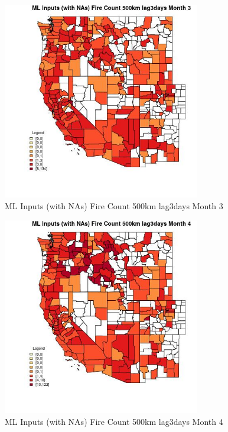 \begin{figure} 
\centering  
\includegraphics[width=0.77\textwidth]{Code_Outputs/Report_ML_input_PM25_Step4_part_e_de_duplicated_aves_compiled_2019-05-21wNAs_CountyFire_Count_500km_lag3daysmedianMonth3.jpg} 
\caption{\label{fig:Report_ML_input_PM25_Step4_part_e_de_duplicated_aves_compiled_2019-05-21wNAsCountyFire_Count_500km_lag3daysmedianMonth3}ML Inputs (with NAs) Fire Count 500km lag3days Month 3} 
\end{figure} 
 

\begin{figure} 
\centering  
\includegraphics[width=0.77\textwidth]{Code_Outputs/Report_ML_input_PM25_Step4_part_e_de_duplicated_aves_compiled_2019-05-21wNAs_CountyFire_Count_500km_lag3daysmedianMonth4.jpg} 
\caption{\label{fig:Report_ML_input_PM25_Step4_part_e_de_duplicated_aves_compiled_2019-05-21wNAsCountyFire_Count_500km_lag3daysmedianMonth4}ML Inputs (with NAs) Fire Count 500km lag3days Month 4} 
\end{figure} 
 

